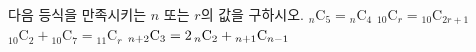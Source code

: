 다음 등식을 만족시키는 $n$ 또는 $r$의 값을 구하시오.
 ${}_n\mathrm{C}_5={}_n\mathrm{C}_4$
 ${}_{10}\mathrm{C}_r={}_{10}\mathrm{C}_{2r+1}$
 ${}_{10}\mathrm{C}_2+{}_{10}\mathrm{C}_7={}_{11}\mathrm{C}_r$
 ${}_{n+2}\mathrm{C}_3=2\mkern3mu {}_n\mathrm{C}_2+{}_{n+1}\mathrm{C}_{n-1}$
